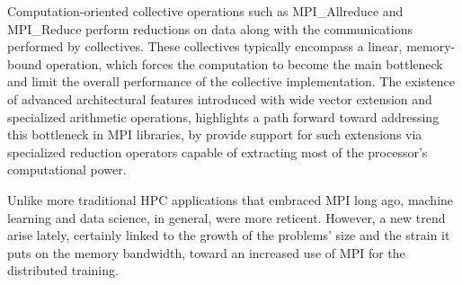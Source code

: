 \documentclass[5p,times,twocolumn]{elsarticle}
\newcommand{\mpi}[0]{\textsc{MPI}\xspace}
\newcommand{\sve}[0]{\textsc{SVE}\xspace}
\begin{document}
Computation-oriented collective operations such as MPI\_Allreduce and MPI\_Reduce perform reductions on
data along with the communications performed by collectives.
These collectives typically encompass a linear, memory-bound operation, which forces
the computation to become the main bottleneck and limit the overall performance of the collective implementation.
The existence of advanced architectural features introduced
with wide vector extension and specialized arithmetic operations, highlights a path forward toward addressing this bottleneck in
MPI libraries, by provide support for such extensions via specialized reduction operators 
capable of extracting most of the processor's computational power.


Unlike more traditional HPC applications that embraced MPI long ago,
machine learning and data science, in general, were more reticent. However,
a new trend arise lately, certainly linked to the growth
of the problems' size and the strain it puts on the memory bandwidth, toward an increased use of \mpi for the distributed training.
\end{document}
